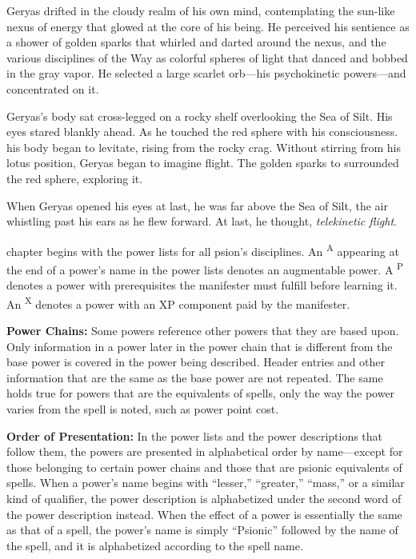 {Geryas drifted in the cloudy realm of his own mind, contemplating the sun-like nexus of energy that glowed at the core of his being. He perceived his sentience as a shower of golden sparks that whirled and darted around the nexus, and the various disciplines of the Way as colorful spheres of light that danced and bobbed in the gray vapor. He selected a large scarlet orb---his psychokinetic powers---and concentrated on it.

Geryas's body sat cross-legged on a rocky shelf overlooking the Sea of Silt. His eyes stared blankly ahead. As he touched the red sphere with his consciousness. his body began to levitate, rising from the rocky crag. Without stirring from his lotus position, Geryas began to imagine flight. The golden sparks to surrounded the red sphere, exploring it.


When Geryas opened his eyes at last, he was far above the Sea of Silt, the air whistling past his ears as he flew forward. At last, he thought, \emph{telekinetic flight}.}
{}

 chapter begins with the power lists for all psion's disciplines. An \textsuperscript{A} appearing at the end of a power's name in the power lists denotes an augmentable power. A \textsuperscript{P} denotes a power with prerequisites the manifester must fulfill before learning it. An \textsuperscript{X} denotes a power with an XP component paid by the manifester.

\textbf{Power Chains:} Some powers reference other powers that they are based upon. Only information in a power later in the power chain that is different from the base power is covered in the power being described. Header entries and other information that are the same as the base power are not repeated. The same holds true for powers that are the equivalents of spells, only the way the power varies from the spell is noted, such as power point cost.

\textbf{Order of Presentation:} In the power lists and the power descriptions that follow them, the powers are presented in alphabetical order by name---except for those belonging to certain power chains and those that are psionic equivalents of spells. When a power's name begins with ``lesser,'' ``greater,'' ``mass,'' or a similar kind of qualifier, the power description is alphabetized under the second word of the power description instead. When the effect of a power is essentially the same as that of a spell, the power's name is simply ``Psionic'' followed by the name of the spell, and it is alphabetized according to the spell name.

